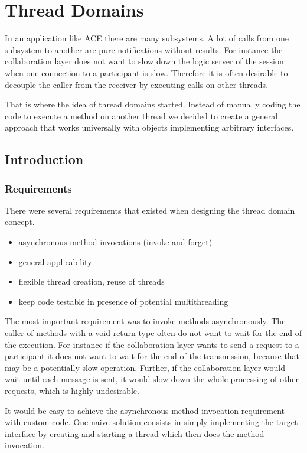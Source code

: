 \chapter{Thread Domains}

In an application like ACE there are many subsystems. A lot of calls from
one subsystem to another are pure notifications without results. For instance
the collaboration layer does not want to slow down the logic server of the
session when one connection to a participant is slow. Therefore it is
often desirable to decouple the caller from the receiver by executing calls
on other threads.

That is where the idea of thread domains started. Instead of manually coding
the code to execute a method on another thread we decided to create a general
approach that works universally with objects implementing arbitrary interfaces.



\section{Introduction}

\subsection{Requirements}
There were several requirements that existed when designing the thread
domain concept.

\begin{itemize}
 \item asynchronous method invocations (invoke and forget)
 \item general applicability
 \item flexible thread creation, reuse of threads
 \item keep code testable in presence of potential multithreading
\end{itemize}

The most important requirement was to invoke methods asynchronously. 
The caller of methods with a void return type often do not want to wait
for the end of the execution. For instance if the collaboration layer wants
to send a request to a participant it does not want to wait for the end
of the transmission, because that may be a potentially slow operation. 
Further, if the collaboration layer would wait until each message is sent,
it would slow down the whole processing of other requests, which is highly
undesirable.

It would be easy to achieve the asynchronous method invocation requirement
with custom code. One naive solution consists in simply implementing the target
interface by creating and starting a thread which then does the method
invocation.

